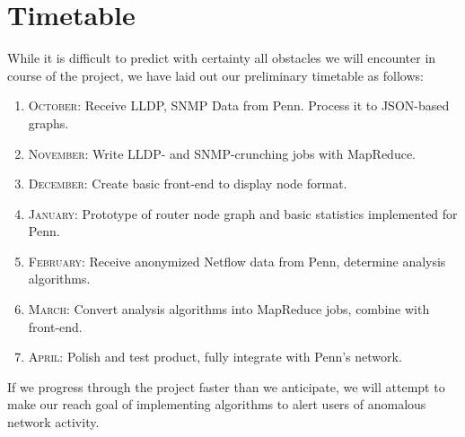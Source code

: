 \documentclass{sig-alternate}
\begin{document}
\section{Timetable}

While it is difficult to predict with certainty all obstacles we will encounter
in course of the project, we have laid out our preliminary timetable as follows:

\begin{enumerate}
    \item \textsc{October}: Receive LLDP, SNMP Data from Penn. Process it to
        JSON-based graphs.
    \item \textsc{November}: Write LLDP- and SNMP-crunching jobs with MapReduce.
    \item \textsc{December}: Create basic front-end to display node format.
    \item \textsc{January}: Prototype of router node graph and basic statistics
        implemented for Penn.
    \item \textsc{February}: Receive anonymized Netflow data from Penn,
        determine analysis algorithms.
    \item \textsc{March}: Convert analysis algorithms into MapReduce jobs,
        combine with front-end.
    \item \textsc{April}: Polish and test product, fully integrate with Penn's
        network.
\end{enumerate}

If we progress through the project faster than we anticipate, we will attempt to
make our reach goal of implementing algorithms to alert users of anomalous
network activity.



\end{document}
